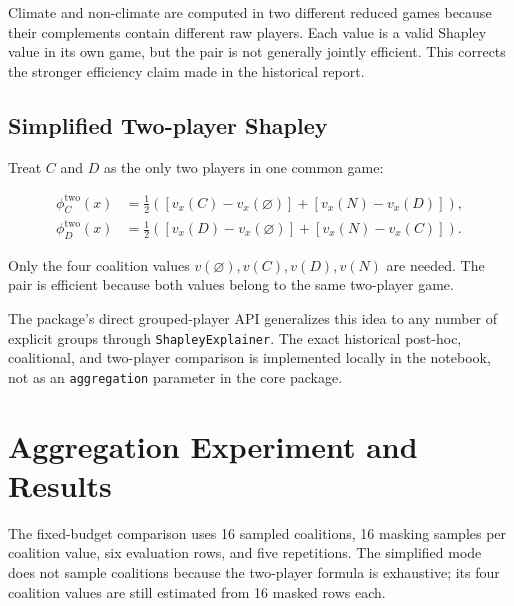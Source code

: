 \documentclass[11pt]{article}
\newcommand{\code}[1]{\texttt{#1}}
\begin{document}
Climate and non-climate are computed in two different reduced games because
their complements contain different raw players.  Each value is a valid
Shapley value in its own game, but the pair is not generally jointly efficient.
This corrects the stronger efficiency claim made in the historical report.

\subsection{Simplified Two-player Shapley}

Treat \(C\) and \(D\) as the only two players in one common game:

\begin{align}
\phi_C^{\mathrm{two}}(x)
  &=\tfrac12\left([v_x(C)-v_x(\varnothing)]
                 +[v_x(N)-v_x(D)]\right),\\
\phi_D^{\mathrm{two}}(x)
  &=\tfrac12\left([v_x(D)-v_x(\varnothing)]
                 +[v_x(N)-v_x(C)]\right).
\end{align}

Only the four coalition values
\(v(\varnothing),v(C),v(D),v(N)\) are needed.
The pair is efficient because both values belong to the same two-player game.

The package's direct grouped-player API generalizes this idea to any number of
explicit groups through \code{ShapleyExplainer}.  The exact historical post-hoc,
coalitional, and two-player comparison is implemented locally in the notebook,
not as an \code{aggregation} parameter in the core package.

\section{Aggregation Experiment and Results}

The fixed-budget comparison uses 16 sampled coalitions, 16 masking samples per
coalition value, six evaluation rows, and five repetitions.  The simplified
mode does not sample coalitions because the two-player formula is exhaustive;
its four coalition values are still estimated from 16 masked rows each.
\end{document}
